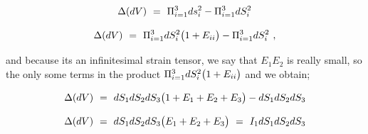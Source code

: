\documentclass{article}
\begin{document}
\begin{equation} \label{eb-eq-1-90}
 \Delta ( dV ) \hspace{0.125cm} = \hspace{0.125cm} \Pi_{i \hspace{0.005cm} = \hspace{0.005cm} 1}^{3} ds_{i}^2 - \Pi_{i \hspace{0.005cm} = \hspace{0.005cm} 1}^{3} dS_{i}^2 
\end{equation} 

\begin{equation} \label{eb-eq-1-91}
 \Delta ( dV ) \hspace{0.125cm} = \hspace{0.125cm} \Pi_{i \hspace{0.005cm} = \hspace{0.005cm} 1}^{3} dS_{i}^2 \big( 1 + E_{i i} \big) - \Pi_{i \hspace{0.005cm} = \hspace{0.005cm} 1}^{3} dS_{i}^2  \hspace{0.125cm} ,
\end{equation} 

and because its an infinitesimal strain tensor, we say that \begin{math} E_1 E_2 \end{math} is really small, so the only some terms in the product \begin{math} \Pi_{i \hspace{0.005cm} = \hspace{0.005cm} 1}^{3} dS_{i}^2 \big( 1 + E_{i i} \big) \end{math} and we obtain;

\begin{equation} \label{eb-eq-1-92}
 \Delta ( dV ) \hspace{0.125cm} = \hspace{0.125cm}  dS_1 dS_2 dS_3 \big( 1 + E_1 + E_2 + E_3 \big) - dS_1 dS_2 dS_3 
\end{equation} 

\begin{equation} \label{eb-eq-1-93}
 \Delta ( dV ) \hspace{0.125cm} = \hspace{0.125cm}  dS_1 dS_2 dS_3 \big( E_1 + E_2 + E_3 \big) \hspace{0.125cm} = \hspace{0.125cm}  I_1 dS_1 dS_2 dS_3
\end{equation} 
\end{document}

